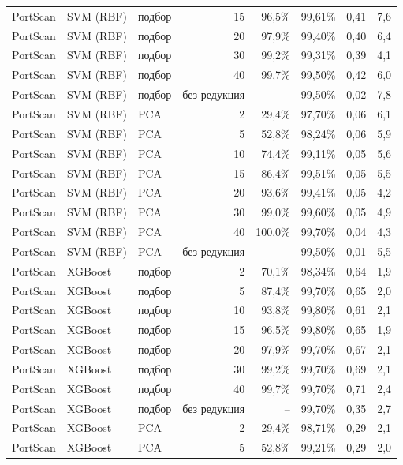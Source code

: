 {\begin{tabular}{@{}lllrrrrr@{}}
\rowcolor{rowalt}PortScan & SVM (RBF) & подбор & 15 & 96,5\% & 99,61\% & 0,41 & 7,6\\
PortScan & SVM (RBF) & подбор & 20 & 97,9\% & 99,40\% & 0,40 & 6,4\\
\rowcolor{rowalt}PortScan & SVM (RBF) & подбор & 30 & 99,2\% & 99,31\% & 0,39 & 4,1\\
PortScan & SVM (RBF) & подбор & 40 & 99,7\% & 99,50\% & 0,42 & 6,0\\
\rowcolor{rowalt}PortScan & SVM (RBF) & подбор & без редукция & -- & 99,50\% & 0,02 & 7,8\\
PortScan & SVM (RBF) & PCA & 2 & 29,4\% & 97,70\% & 0,06 & 6,1\\
\rowcolor{rowalt}PortScan & SVM (RBF) & PCA & 5 & 52,8\% & 98,24\% & 0,06 & 5,9\\
PortScan & SVM (RBF) & PCA & 10 & 74,4\% & 99,11\% & 0,05 & 5,6\\
\rowcolor{rowalt}PortScan & SVM (RBF) & PCA & 15 & 86,4\% & 99,51\% & 0,05 & 5,5\\
PortScan & SVM (RBF) & PCA & 20 & 93,6\% & 99,41\% & 0,05 & 4,2\\
\rowcolor{rowalt}PortScan & SVM (RBF) & PCA & 30 & 99,0\% & 99,60\% & 0,05 & 4,9\\
PortScan & SVM (RBF) & PCA & 40 & 100,0\% & 99,70\% & 0,04 & 4,3\\
\rowcolor{rowalt}PortScan & SVM (RBF) & PCA & без редукция & -- & 99,50\% & 0,01 & 5,5\\
PortScan & XGBoost & подбор & 2 & 70,1\% & 98,34\% & 0,64 & 1,9\\
\rowcolor{rowalt}PortScan & XGBoost & подбор & 5 & 87,4\% & 99,70\% & 0,65 & 2,0\\
PortScan & XGBoost & подбор & 10 & 93,8\% & 99,80\% & 0,61 & 2,1\\
\rowcolor{rowalt}PortScan & XGBoost & подбор & 15 & 96,5\% & 99,80\% & 0,65 & 1,9\\
PortScan & XGBoost & подбор & 20 & 97,9\% & 99,70\% & 0,67 & 2,1\\
\rowcolor{rowalt}PortScan & XGBoost & подбор & 30 & 99,2\% & 99,70\% & 0,69 & 2,1\\
PortScan & XGBoost & подбор & 40 & 99,7\% & 99,70\% & 0,71 & 2,4\\
\rowcolor{rowalt}PortScan & XGBoost & подбор & без редукция & -- & 99,70\% & 0,35 & 2,7\\
PortScan & XGBoost & PCA & 2 & 29,4\% & 98,71\% & 0,29 & 2,1\\
\rowcolor{rowalt}PortScan & XGBoost & PCA & 5 & 52,8\% & 99,21\% & 0,29 & 2,0\\

\end{tabular}}
